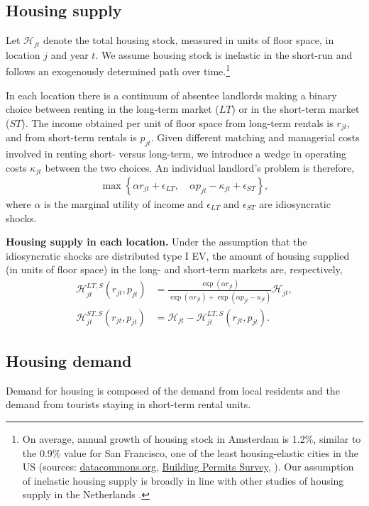 \documentclass[11pt]{article}
\newcommand{\Paragraph}{\vspace{0.1cm}\noindent\textbf}
\begin{document}
\subsection{Housing supply}\label{sec: housing_supply}
Let $\mathcal{H}_{jt}$ denote the total housing stock, measured in units of floor space, in location $j$ and year $t$. We assume housing stock is inelastic in the short-run and follows an exogenously determined path over time.\footnote{On average, annual growth of housing stock in Amsterdam is 1.2\%, similar to the 0.9\% value for San Francisco, one of the least housing-elastic cities in the US (sources: \href{www.datacommons.org}{datacommons.org}, \href{https://www.census.gov/construction/bps/index.html}{Building Permits Survey}, \cite{saiz2010geographic}). Our assumption of inelastic housing supply is broadly in line with other studies of housing supply in the Netherlands \citep{vermeulen2007housing}.} 

In each location there is a continuum of absentee landlords making a binary choice between renting in the long-term market ($LT$) or in the short-term market ($ST$). The income obtained per unit of floor space from long-term rentals is $r_{jt}$, and from short-term rentals is $p_{jt}$. Given different matching and managerial costs involved in renting short- versus long-term, we introduce a wedge in operating costs $\kappa_{jt}$ between the two choices. An individual landlord's problem is therefore,
\begin{align*}
   \max\left\{\alpha r_{jt}+\epsilon_{LT}, \quad  \alpha p_{jt}-\kappa_{jt}+\epsilon_{ST} \right\},
\end{align*}
where $\alpha$ is the marginal utility of income and $\epsilon_{LT}$ and $\epsilon_{ST}$ are idiosyncratic shocks. 

\Paragraph{Housing supply in each location.} Under the assumption that the idiosyncratic shocks are distributed type I EV, the amount of housing supplied (in units of floor space) in the long- and short-term markets are, respectively,
\begin{align}\label{eq: housing supply - LT}
\mathcal{H}^{LT,S}_{jt}(r_{jt}, p_{jt}) & = \frac{\exp(\alpha r_{jt})}{\exp(\alpha r_{jt})+\exp( \alpha p_{jt}-\kappa_{jt})} \mathcal{H}_{jt}, \\ \label{eq: housing supply - ST}
\mathcal{H}^{ST,S}_{jt}(r_{jt}, p_{jt}) & = \mathcal{H}_{jt} - \mathcal{H}^{LT,S}_{jt}(r_{jt}, p_{jt}).
\end{align}

\subsection{Housing demand}\label{sec: housing_demand}
Demand for housing is composed of the demand from local residents and the demand from tourists staying in short-term rental units.
\vspace{-0.3cm}
\end{document}
